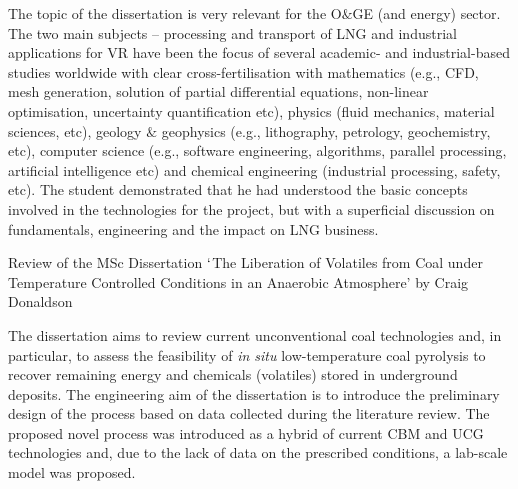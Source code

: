 \documentclass[14pt,twoside]{report}
\begin{document}
The topic of the dissertation is very relevant for the O$\&$GE (and energy) sector. The two main subjects -- processing and transport of LNG and industrial applications for VR have been the focus of several academic- and industrial-based studies worldwide with clear cross-fertilisation with mathematics (e.g., CFD, mesh generation, solution of partial differential equations, non-linear optimisation, uncertainty quantification etc), physics (fluid mechanics, material sciences, etc), geology $\&$ geophysics (e.g., lithography, petrology, geochemistry, etc), computer science (e.g., software engineering, algorithms, parallel processing, artificial intelligence etc) and chemical engineering (industrial processing, safety, etc). The student demonstrated that he had understood the basic concepts involved in the technologies for the project, but with a superficial discussion on fundamentals, engineering and the impact on LNG business.    


\clearpage


\medskip

\begin{center}
{\Large Review of the MSc Dissertation $\lq$The Liberation of Volatiles from Coal under Temperature Controlled Conditions in an Anaerobic Atmosphere' by Craig Donaldson}
\end{center}

\medskip

The dissertation aims to review current unconventional coal technologies and, in particular, to assess the feasibility of {\it in situ} low-temperature coal pyrolysis to recover remaining energy and chemicals (volatiles) stored in underground deposits. The engineering aim of the dissertation is to introduce the preliminary design of the process based on data collected during the literature review. The proposed novel process was introduced as a hybrid of current CBM and UCG technologies and, due to the lack of data on the prescribed conditions, a lab-scale model was proposed.
\end{document}
